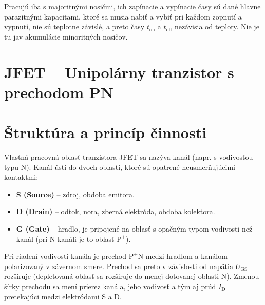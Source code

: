 Pracujú iba s majoritnými nosičmi, ich zapínacie a vypínacie časy sú dané hlavne parazitnými kapacitami, ktoré sa musia nabiť a vybiť pri každom zopnutí a vypnutí, nie sú teplotne závislé, a preto časy $t_{\text{on}}$ a $t_{\text{off}}$ nezávisia od teploty. Nie je tu jav akumulácie minoritných nosičov. 

\section{JFET – Unipolárny tranzistor s prechodom PN}

\section{Štruktúra a princíp činnosti}
Vlastná pracovná oblasť tranzistora JFET sa nazýva kanál (napr. s vodivosťou typu N). Kanál ústi do dvoch oblastí, ktoré sú opatrené neusmerňujúcimi kontaktmi:
\begin{itemize}
	\item \textbf{S (Source)} – zdroj, obdoba emitora.
	\item \textbf{D (Drain)} – odtok, nora, zberná elektróda, obdoba kolektora.
	\item \textbf{G (Gate)} – hradlo, je pripojené na oblasť s opačným typom vodivosti než kanál (pri N-kanáli je to oblasť $\text{P}^+$).
\end{itemize}

Pri riadení vodivosti kanála je prechod $\text{P}^+\text{N}$ medzi hradlom a kanálom polarizovaný v závernom smere. Prechod sa preto v závislosti od napätia $U_{\text{GS}}$ rozširuje (depletovaná oblasť sa rozširuje do menej dotovanej oblasti N). Zmenou šírky prechodu sa mení prierez kanála, jeho vodivosť a tým aj prúd $I_{\text{D}}$ pretekajúci medzi elektródami S a D.

